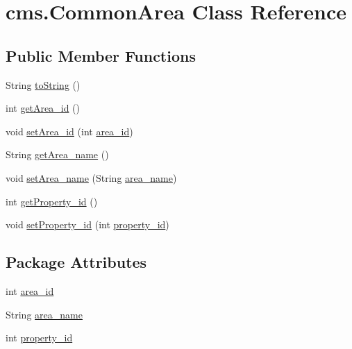 \hypertarget{classcms_1_1_common_area}{}\section{cms.\+Common\+Area Class Reference}
\label{classcms_1_1_common_area}
\subsection*{Public Member Functions}
\begin{DoxyCompactItemize}
\item 
String \mbox{\hyperlink{classcms_1_1_common_area_ad7c0ab35343d4d090bb9bfbd09acb066}{to\+String}} ()
\item 
int \mbox{\hyperlink{classcms_1_1_common_area_a4402935b233ff59efcdf49e66267572a}{get\+Area\+\_\+id}} ()
\item 
void \mbox{\hyperlink{classcms_1_1_common_area_a638300af7cbf39637ec8eb4003948759}{set\+Area\+\_\+id}} (int \mbox{\hyperlink{classcms_1_1_common_area_a60b2c63a3a45ca2ac12dc5aa6cd9c8c6}{area\+\_\+id}})
\item 
String \mbox{\hyperlink{classcms_1_1_common_area_a6cf1f28399121fad09549a07ed108326}{get\+Area\+\_\+name}} ()
\item 
void \mbox{\hyperlink{classcms_1_1_common_area_aa3c6ef585e3fb3721312e2e22edcd9d7}{set\+Area\+\_\+name}} (String \mbox{\hyperlink{classcms_1_1_common_area_a5f5060702efd265baeb61a83a9135088}{area\+\_\+name}})
\item 
int \mbox{\hyperlink{classcms_1_1_common_area_a09cd28c7fc06cde4a06193cf00f8ac92}{get\+Property\+\_\+id}} ()
\item 
void \mbox{\hyperlink{classcms_1_1_common_area_a49ca83f36809d67c0556917c95e77608}{set\+Property\+\_\+id}} (int \mbox{\hyperlink{classcms_1_1_common_area_ad40e54e3b27cd75b9010bb8bc3d3acca}{property\+\_\+id}})
\end{DoxyCompactItemize}
\subsection*{Package Attributes}
\begin{DoxyCompactItemize}
\item 
int \mbox{\hyperlink{classcms_1_1_common_area_a60b2c63a3a45ca2ac12dc5aa6cd9c8c6}{area\+\_\+id}}
\item 
String \mbox{\hyperlink{classcms_1_1_common_area_a5f5060702efd265baeb61a83a9135088}{area\+\_\+name}}
\item 
int \mbox{\hyperlink{classcms_1_1_common_area_ad40e54e3b27cd75b9010bb8bc3d3acca}{property\+\_\+id}}
\end{DoxyCompactItemize}


